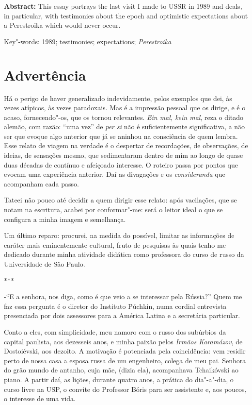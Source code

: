 \textbf{Abstract:} This essay portrays the last visit I made to USSR in
1989 and deals, in particular, with testimonies about the epoch and
optimistic expectations about a Perestroika which would never occur.

Key"-words: 1989; testimonies; expectations; \emph{Perestroika}

\section{Advertência}

Há o perigo de haver generalizado indevidamente, pelos exemplos que dei,
às vezes atípicos, às vezes paradoxais. Mas é a impressão pessoal que os
dirige, e é o acaso, fornecendo"-os, que os tornou relevantes. \emph{Ein
mal, kein mal}, reza o ditado alemão, com razão: ``uma vez'' de
\emph{per si} não é suficientemente significativa, a não ser que evoque
algo anterior que já se aninhou na consciência de quem lembra. Esse
relato de viagem na verdade é o despertar de recordações, de
observações, de ideias, de sensações mesmo, que sedimentaram dentro de
mim ao longo de quase duas décadas de contínuo e afeiçoado interesse. O
roteiro passa por pontos que evocam uma experiência anterior. Daí as
divagações e os \emph{consideranda} que acompanham cada passo.

Tateei não pouco até decidir a quem dirigir esse relato: após
vacilações, que se notam na escritura, acabei por conformar"-me: será o
leitor ideal o que se configura a minha imagem e semelhança.

Um último reparo: procurei, na medida do possível, limitar as
informações de caráter mais eminentemente cultural, fruto de pesquisas
às quais tenho me dedicado durante minha atividade didática como
professora do curso de russo da Universidade de São Paulo.

***

-``E a senhora, nos diga, como é que veio a se interessar pela Rússia?''
Quem me faz essa pergunta é o diretor do Instituto Púchkin, numa cordial
entrevista presenciada por dois assessores para a América Latina e a
secretária particular.

Conto a eles, com simplicidade, meu namoro com o russo dos subúrbios da
capital paulista, aos dezesseis anos, e minha paixão pelos \emph{Irmãos
Karamázov}, de Dostoiévski, aos dezoito. A motivação é potenciada pela
coincidência: vem residir perto de nossa casa a esposa russa de um
engenheiro, colega de meu pai. Senhora do grão mundo de antanho, cuja
mãe, (dizia ela), acompanhava Tchaikóvski ao piano. A partir daí, as
lições, durante quatro anos, a prática do dia"-a"-dia, o curso livre na
USP, o convite do Professor Bóris para ser assistente e, aos poucos, o
interesse de uma vida.

